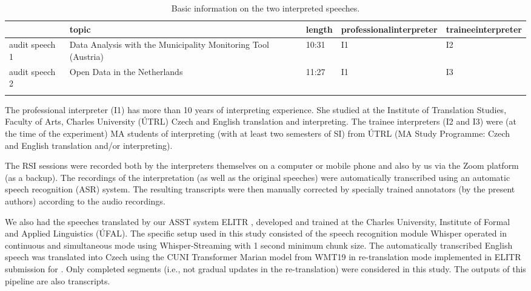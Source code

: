 \documentclass[output=paper]{langscibook}
\begin{document}
\begin{table}
\begin{tabularx}{\textwidth}{lQ@{}lp{20mm}p{18mm}}
\lsptoprule
                & topic & length & professional\newline interpreter & trainee\newline interpreter\\
\midrule
audit speech 1 & Data Analysis with the Municipality Monitoring Tool (Austria) & 10:31 & I1 & I2\\
audit speech 2 & Open Data in the Netherlands & 11:27 & I1 & I3\\
\lspbottomrule
\end{tabularx}
\caption{Basic information on the two interpreted speeches.}
\label{tab:kloudova:1}
\end{table}

The professional interpreter (I1) has more than 10 years of interpreting experience. She studied at the Institute of Translation Studies, Faculty of Arts, Charles University (ÚTRL) Czech and English translation and interpreting. The trainee interpreters (I2 and I3) were (at the time of the experiment) MA students of interpreting (with at least two semesters of SI) from ÚTRL (MA Study Programme: Czech and English translation and/or interpreting).

The RSI sessions were recorded both by the interpreters themselves on a computer or mobile phone and also by us via the Zoom platform (as a backup). The recordings of the interpretation (as well as the original speeches) were automatically transcribed using an automatic speech recognition (ASR) system. The resulting transcripts were then manually corrected by specially trained annotators (by the present authors) according to the audio recordings.

We also had the speeches translated by our ASST system ELITR \citep{bojar_elitr_2021}, developed and trained at the Charles University, Institute of Formal and Applied Linguistics (ÚFAL). The specific setup used in this study consisted of the speech recognition module Whisper \citep{RadfordEtAl2023} operated in continuous and simultaneous mode using Whisper-Streaming \citep{MacháčekEtAl2023} with 1 second minimum chunk size. The automatically transcribed English speech was translated into Czech using the CUNI Transformer Marian model from WMT19 \citep{PopelEtAl2019} in re-translation mode implemented in ELITR submission for \citealt{IWSLT2020} \citep{MacháčekEtAl2020}. Only completed segments (i.e., not gradual updates in the re-translation) were considered in this study. The outputs of this pipeline are also transcripts.
\end{document}
